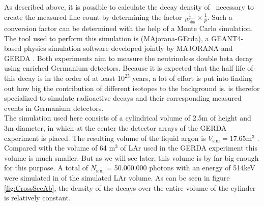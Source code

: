 \documentclass[encoding=utf8,british]{tumphthesis}
\begin{document}
As described above, it is possible to calculate the decay density of \Kr\ necessary to create the measured line count by determining the factor $\frac{1}{\epsilon V_{\mathrm{sim}}} \times \frac{1}{p}$. 
Such a conversion factor can be determined with the help of a Monte Carlo simulation.
The tool used to perform this simulation is \mage (MAjorana-GErda), a GEANT4-based physics simulation software developed jointly by MAJORANA and GERDA \cite{boswell_mage_2010}.
Both experiments aim to measure the neutrinoless double beta decay using enriched Germanium detectors.
Because it is expected that the half life of this decay is in the order of at least \(10^{25}\) years, a lot of effort is put into finding out how big the contribution of different isotopes to the background is.
\mage is therefor specialized to simulate radioactive decays and their corresponding measured events in Germanium detectors.
\\

The simulation used here consists of a cylindrical volume of 2.5m of height and 3m diameter, in which at the center the detector arrays of the GERDA experiment is placed.
The resulting volume of the liquid argon is $V_{\mathrm{sim}} = 17.65 \mathrm{m}^3$ .
Compared with the volume of 64 m\(^3\) of LAr used in the GERDA experiment this volume is much smaller.
But as we will see later, this volume is by far big enough for this purpose.
A total of $N_{\mathrm{sim}}$ = 50.000.000 photons with an energy of 514keV were simulated in of the simulated LAr volume. 
As can be seen in figure \ref{fig:CrossSecAb}, the density of the decays over the entire volume of the cylinder is relatively constant.
\\
\end{document}
